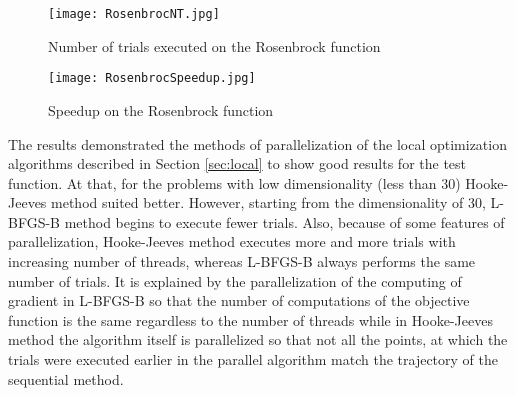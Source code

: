 \documentclass[runningheads]{llncs}
\begin{document}
%

\begin{figure}
\begin{center}
  \texttt{[image: RosenbrocNT.jpg]}
  \caption{Number of trials executed on the Rosenbrock function}
  \label{fig:RosenbrocNT}  
\end{center}
\end{figure}

\begin{figure}
\begin{center}
  \texttt{[image: RosenbrocSpeedup.jpg]}
  \caption{Speedup on the Rosenbrock function}
  \label{fig:RosenbrocSpeedup}  
\end{center}
\end{figure}


The results demonstrated the methods of parallelization of the local optimization algorithms described in Section \ref{sec:local} to show good results for the test function. At that, for the problems with low dimensionality (less than 30) Hooke-Jeeves method suited better. However, starting from the dimensionality of 30, L-BFGS-B method begins to execute fewer trials. Also, because of some features of parallelization, Hooke-Jeeves method executes more and more trials with increasing number of threads, whereas L-BFGS-B always performs the same number of trials. It is explained by the parallelization of the computing of gradient in L-BFGS-B so that the number of computations of the objective function is the same regardless to the number of threads while in Hooke-Jeeves method the algorithm itself is parallelized so that not all the points, at which the trials were executed earlier in the parallel algorithm match the trajectory of the sequential method.
\end{document}
